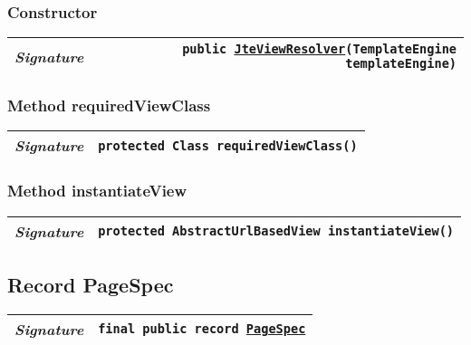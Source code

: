 \begin{adjustwidth}{1.5em}{0pt}
\begin{adjustwidth}{1.5em}{0pt}
{\begin{tabularx}{1.0\linewidth}{@{}l R@{}}
    \end{tabularx}}\subsubsection{Constructor\label{edu.kit.hci.soli.config.template.JteViewResolver@edu.kit.hci.soli.config.template.JteViewResolver(gg.jte.TemplateEngine)}}
    \begin{adjustwidth}{1.5em}{0pt}
      {\begin{tabularx}{1.0\linewidth}{@{}l R@{}}
        \emph{Signature} & \texttt{public \texttt{\hyperref[edu.kit.hci.soli.config.template.JteViewResolver]{\texttt{JteViewResolver}}}(\texttt{TemplateEngine} templateEngine)} \\
        \hline
  
      \end{tabularx}}
    \end{adjustwidth}\subsubsection{Method requiredViewClass\label{edu.kit.hci.soli.config.template.JteViewResolver@requiredViewClass()}}
    \begin{adjustwidth}{1.5em}{0pt}
      {\begin{tabularx}{1.0\linewidth}{@{}l R@{}}
        \emph{Signature} & \texttt{protected \texttt{Class} requiredViewClass()} \\
        \hline
  
      \end{tabularx}}
    \end{adjustwidth}\subsubsection{Method instantiateView\label{edu.kit.hci.soli.config.template.JteViewResolver@instantiateView()}}
    \begin{adjustwidth}{1.5em}{0pt}
      {\begin{tabularx}{1.0\linewidth}{@{}l R@{}}
        \emph{Signature} & \texttt{protected \texttt{AbstractUrlBasedView} instantiateView()} \\
        \hline
  
      \end{tabularx}}
    \end{adjustwidth}
  \end{adjustwidth}\subsection{Record PageSpec\label{edu.kit.hci.soli.config.template.PageSpec} }
  \begin{adjustwidth}{1.5em}{0pt}
    {\begin{tabularx}{1.0\linewidth}{@{}l R@{}}
      \emph{Signature} & \texttt{final public  record \texttt{\hyperref[edu.kit.hci.soli.config.template.PageSpec]{\texttt{PageSpec}}}} \\
      \hline
  

\end{tabularx}}
\end{adjustwidth}
\end{adjustwidth}
